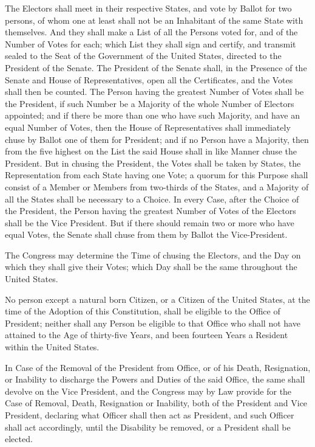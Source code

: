 \documentclass{constitution}
\begin{document}
The Electors shall meet in their respective States, and vote by Ballot for two persons,
of whom one at least shall not be an Inhabitant of the same State with themselves.
And they shall make a List of all the Persons voted for, and of the Number of Votes for each;
which List they shall sign and certify, and transmit sealed to the Seat of the Government of the United States, directed to the President of the Senate.
The President of the Senate shall, in the Presence of the Senate and House of Representatives, open all the Certificates, and the Votes shall then be counted.
The Person having the greatest Number of Votes shall be the President, if such Number be a Majority of the whole Number of Electors appointed;
and if there be more than one who have such Majority, and have an equal Number of Votes,
then the House of Representatives shall immediately chuse by Ballot one of them for President;
and if no Person have a Majority, then from the five highest on the List the said House shall in like Manner chuse the President.
But in chusing the President, the Votes shall be taken by States, the Representation from each State having one Vote;
a quorum for this Purpose shall consist of a Member or Members from two-thirds of the States,
and a Majority of all the States shall be necessary to a Choice.
In every Case, after the Choice of the President,
the Person having the greatest Number of Votes of the Electors shall be the Vice President.
But if there should remain two or more who have equal Votes,
the Senate shall chuse from them by Ballot the Vice-President.

The Congress may determine the Time of chusing the Electors, and the Day on which they shall give their Votes;
which Day shall be the same throughout the United States.

No person except a natural born Citizen,
or a Citizen of the United States, at the time of the Adoption of this Constitution,
shall be eligible to the Office of President;
neither shall any Person be eligible to that Office who shall not have attained to the Age of thirty-five Years,
 and been fourteen Years a Resident within the United States.

In Case of the Removal of the President from Office, or of his Death, Resignation, or Inability to discharge the Powers and Duties of the said Office, the same shall devolve on the Vice President,
and the Congress may by Law provide for the Case of Removal, Death, Resignation or Inability, both of the President and Vice President,
declaring what Officer shall then act as President, and such Officer shall act accordingly,
until the Disability be removed, or a President shall be elected.
\end{document}
